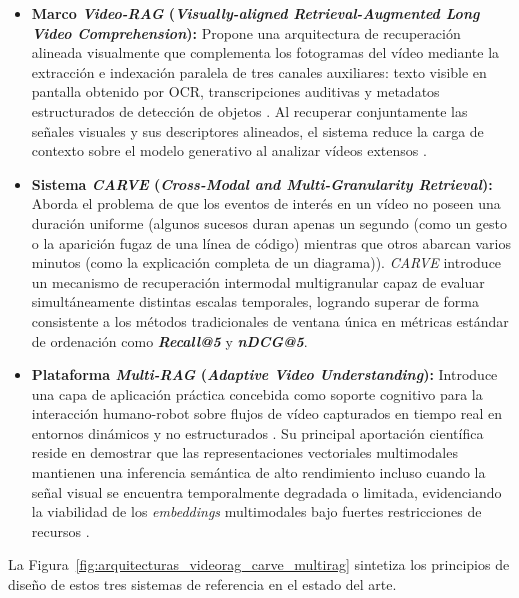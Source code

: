 \begin{itemize}
    \item \textbf{Marco \textit{Video-RAG} (\textit{Visually-aligned Retrieval-Augmented Long Video Comprehension}):} Propone una arquitectura de recuperación alineada visualmente que complementa los fotogramas del vídeo mediante la extracción e indexación paralela de tres canales auxiliares: texto visible en pantalla obtenido por OCR, transcripciones auditivas y metadatos estructurados de detección de objetos \cite{video_rag2024}. %
    Al recuperar conjuntamente las señales visuales y sus descriptores alineados, el sistema reduce la carga de contexto sobre el modelo generativo al analizar vídeos extensos \cite{video_rag2024}. %
    \item \textbf{Sistema \textit{CARVE} (\textit{Cross-Modal and Multi-Granularity Retrieval}):} Aborda el problema de que los eventos de interés en un vídeo no poseen una duración uniforme (algunos sucesos duran apenas un segundo (como un gesto o la aparición fugaz de una línea de código) mientras que otros abarcan varios minutos (como la explicación completa de un diagrama)). %
    \textit{CARVE} introduce un mecanismo de recuperación intermodal multigranular capaz de evaluar simultáneamente distintas escalas temporales, logrando superar de forma consistente a los métodos tradicionales de ventana única en métricas estándar de ordenación como \textbf{\textit{Recall@5}} y \textbf{\textit{nDCG@5}}. %
    \item \textbf{Plataforma \textit{Multi-RAG} (\textit{Adaptive Video Understanding}):} Introduce una capa de aplicación práctica concebida como soporte cognitivo para la interacción humano-robot sobre flujos de vídeo capturados en tiempo real en entornos dinámicos y no estructurados \cite{multi_rag2025}. %
    Su principal aportación científica reside en demostrar que las representaciones vectoriales multimodales mantienen una inferencia semántica de alto rendimiento incluso cuando la señal visual se encuentra temporalmente degradada o limitada, evidenciando la viabilidad de los \textit{embeddings} multimodales bajo fuertes restricciones de recursos \cite{multi_rag2025}. %
\end{itemize}

La Figura~\ref{fig:arquitecturas_videorag_carve_multirag} sintetiza los principios de diseño de estos tres sistemas de referencia en el estado del arte. %

